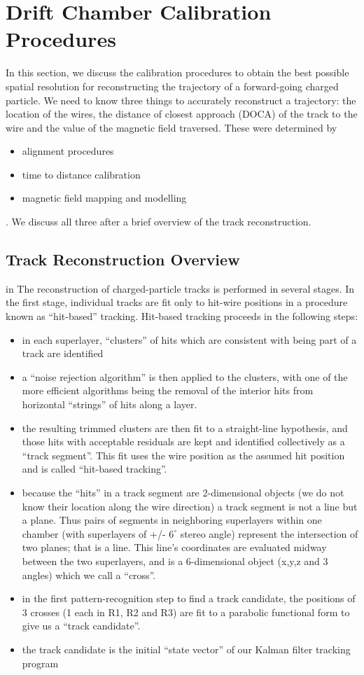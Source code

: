 \section{Drift Chamber Calibration Procedures}
In this section, we discuss the calibration procedures to obtain the 
best possible spatial resolution for reconstructing the trajectory of
a forward-going charged particle.  We need to know three things to 
accurately reconstruct a trajectory: the location of the wires, the
distance of closest approach (DOCA) of the track to the wire and the
value of the magnetic field traversed.  These were determined by
\begin{itemize}
\item alignment procedures
\item time to distance calibration
\item magnetic field mapping and modelling
\end{itemize}.  We discuss all three after a brief overview of the track reconstruction.

\subsection{Track Reconstruction Overview}

 in
The reconstruction of charged-particle tracks is performed in several stages.  In 
the first stage, individual tracks are fit only to hit-wire positions in a 
procedure known as ``hit-based'' tracking.  Hit-based tracking proceeds
in the following steps:
\begin{itemize}
\item in each superlayer, ``clusters'' of hits which are consistent with
being part of a track are identified
\item a ``noise rejection algorithm'' is then applied to the clusters, 
with one of the more efficient algorithms being the removal of the
interior hits from horizontal ``strings'' of hits along a layer.
\item the resulting trimmed clusters are then fit to a straight-line hypothesis,
and those hits with acceptable residuals are kept and identified collectively
as a ``track segment''.  This fit uses the wire position as the assumed hit
position and is called ``hit-based tracking''.
\item because the ``hits'' in a track segment are 2-dimensional objects (we
do not know their location along the wire direction) a track segment is not
a line but a plane.  Thus pairs of segments in neighboring superlayers within
one chamber (with superlayers of +/- $6^\circ$ stereo angle) represent the
intersection of two planes; that is a line.  This line's coordinates 
are evaluated midway between the two superlayers, and is a 6-dimensional
object (x,y,z and 3 angles) which we call a ``cross''.
\item in the first pattern-recognition step to find a track candidate,
the positions of 3 crosses (1 each in R1, R2 and R3) are fit to a
parabolic functional form to give us a ``track candidate''.
\item the track candidate is the initial ``state vector'' of our
Kalman filter tracking program
\end{itemize} 


